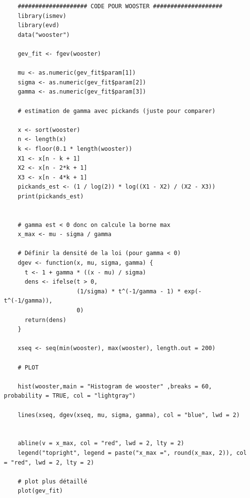 \documentclass{article}
\begin{document}
\begin{lstlisting}
	#################### CODE POUR WOOSTER ####################
	library(ismev)
	library(evd)
	data("wooster")
	
	gev_fit <- fgev(wooster)
	
	mu <- as.numeric(gev_fit$param[1])
	sigma <- as.numeric(gev_fit$param[2])
	gamma <- as.numeric(gev_fit$param[3])
	
	# estimation de gamma avec pickands (juste pour comparer)
	
	x <- sort(wooster)
	n <- length(x)
	k <- floor(0.1 * length(wooster))
	X1 <- x[n - k + 1]
	X2 <- x[n - 2*k + 1]
	X3 <- x[n - 4*k + 1]
	pickands_est <- (1 / log(2)) * log((X1 - X2) / (X2 - X3))
	print(pickands_est)
	
	
	# gamma est < 0 donc on calcule la borne max
	x_max <- mu - sigma / gamma
	
	# Définir la densité de la loi (pour gamma < 0)
	dgev <- function(x, mu, sigma, gamma) {
	  t <- 1 + gamma * ((x - mu) / sigma)
	  dens <- ifelse(t > 0, 
					 (1/sigma) * t^(-1/gamma - 1) * exp(-t^(-1/gamma)), 
					 0)
	  return(dens)
	}
	
	xseq <- seq(min(wooster), max(wooster), length.out = 200)
	
	# PLOT   
	
	hist(wooster,main = "Histogram de wooster" ,breaks = 60, probability = TRUE, col = "lightgray")
	
	lines(xseq, dgev(xseq, mu, sigma, gamma), col = "blue", lwd = 2)
	
	
	abline(v = x_max, col = "red", lwd = 2, lty = 2)
	legend("topright", legend = paste("x_max =", round(x_max, 2)), col = "red", lwd = 2, lty = 2)
	
	# plot plus détaillé
	plot(gev_fit)



	
\end{lstlisting}
\end{document}
